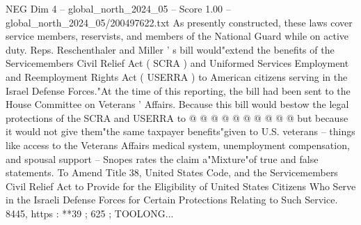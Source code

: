 \begin{textsample}{NEG Dim 4 – global\_north\_2024\_05 – Score 1.00 – global\_north\_2024\_05/200497622.txt}
As presently constructed, these laws cover service members, reservists, and members of the National Guard while on active duty.
Reps.
Reschenthaler and Miller ' s bill would"extend the benefits of the Servicemembers Civil Relief Act ( SCRA ) and Uniformed Services Employment and Reemployment Rights Act ( USERRA ) to American citizens serving in the Israel Defense Forces."At the time of this reporting, the bill had been sent to the House Committee on Veterans ' Affairs.
Because this bill would bestow the legal protections of the SCRA and USERRA to @ @ @ @ @ @ @ @ @ @ but because it would not give them"the same taxpayer benefits"given to U.S. veterans -- things like access to the Veterans Affairs medical system, unemployment compensation, and spousal support -- Snopes rates the claim a"Mixture"of true and false statements.
To Amend Title 38, United States Code, and the Servicemembers Civil Relief Act to Provide for the Eligibility of United States Citizens Who Serve in the Israeli Defense Forces for Certain Protections Relating to Such Service. 8445, https : **39 ; 625 ; TOOLONG...

\end{textsample}
